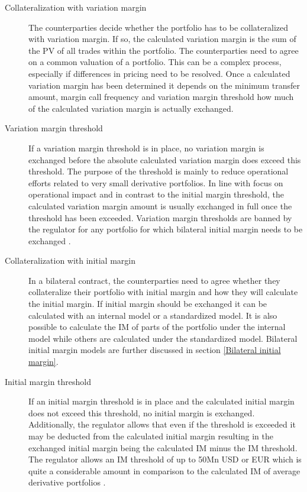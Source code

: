 \documentclass[../Thesis_AHoecherl.tex]{subfiles}
\begin{document}
\begin{description}
    \item[Collateralization with variation margin]
    The counterparties decide whether the portfolio has to be collateralized with variation margin.
    If so, the calculated variation margin is the sum of the \gls{PV} of all trades within the portfolio.
    The counterparties need to agree on a common valuation of a portfolio. This can be a complex process, especially if differences in pricing need to be resolved.
    Once a calculated variation margin has been determined it depends on the minimum transfer amount, margin call frequency and variation margin threshold how much of the calculated variation margin is actually exchanged. 
    \item[Variation margin threshold]
    If a variation margin threshold is in place, no variation margin is exchanged before the absolute calculated variation margin does exceed this threshold.
    The purpose of the threshold is mainly to reduce operational efforts related to very small derivative portfolios. In line with focus on operational impact and in contrast to the initial margin threshold, the calculated variation margin amount is usually exchanged in full once the threshold has been exceeded.
    Variation margin thresholds are banned by the regulator for any portfolio for which bilateral initial margin needs to be exchanged \cite[Requirement 2.1]{BCBS_MarginRequirements}. 
    \item[Collateralization with initial margin]
    In a bilateral contract, the counterparties need to agree whether they collateralize their portfolio with initial margin and how they will calculate the initial margin.
    If initial margin should be exchanged it can be calculated with an internal model or a standardized model. It is also possible to calculate the \gls{IM} of parts of the portfolio under the internal model while others are calculated under the standardized model.
    Bilateral initial margin models are further discussed in section \ref{Bilateral initial margin}.
    \item[Initial margin threshold]
    If an initial margin threshold is in place and the calculated initial margin does not exceed this threshold, no initial margin is exchanged.
    Additionally, the regulator allows that even if the threshold is exceeded it may be deducted from the calculated initial margin resulting in the exchanged initial margin being the calculated \gls{IM} minus the \gls{IM} threshold.
    The regulator allows an \gls{IM} threshold of up to 50Mn USD or EUR \cite[Requirement 2.2]{BCBS_MarginRequirements} which is quite a considerable amount in comparison to the calculated \gls{IM} of average derivative portfolios \cite{ISDAMarginSurvey}.

\end{description}
\end{document}
